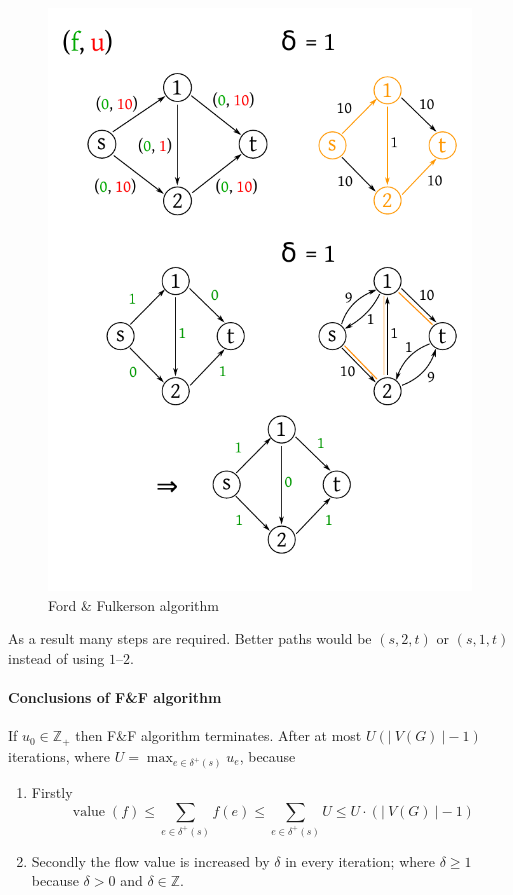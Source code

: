 \documentclass{article}
\newcommand{\card}[1]{\left|\:\!#1\:\!\right|}
\begin{document}
\begin{figure}[!ht]
 \begin{center}
  \includegraphics{img/ff_algo.pdf}
  \caption{Ford \& Fulkerson algorithm}
 \end{center}
\end{figure}

As a result many steps are required. Better paths would be $(s, 2, t)$ or $(s, 1, t)$ instead of using $1$--$2$.

\paragraph{Conclusions of F\&F algorithm}
If $u_0 \in \mathbb{Z}_+$ then F\&F algorithm terminates.
After at most $U(\card{V(G)} - 1)$ iterations, where $U = \max_{e \in \delta^+(s)} u_e$, because
\begin{enumerate}
  \item Firstly
    \[
      \operatorname{value}(f)
        \leq \sum_{e \in \delta^+(s)} f(e)
        \leq \sum_{e \in \delta^+(s)} U
        \leq U \cdot (\card{V(G)} - 1)
    \]
  \item Secondly the flow value is increased by $\delta$ in every iteration; where $\delta \geq 1$ because $\delta > 0$ and $\delta \in \mathbb{Z}$.
\end{enumerate}
\end{document}
